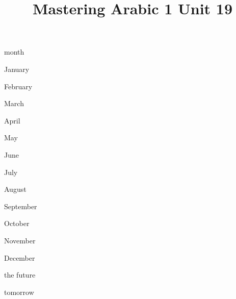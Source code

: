 \documentclass[avery5371,grid,frame]{flashcards}
\title{Mastering Arabic 1 Unit 19}
\begin{document}
\begin{flashcard}{\LARGE month}
\LARGE {}
\end{flashcard}
\begin{flashcard}{\LARGE January}
\LARGE {}
\end{flashcard}
\begin{flashcard}{\LARGE February}
\LARGE {}
\end{flashcard}
\begin{flashcard}{\LARGE March}
\LARGE {}
\end{flashcard}
\begin{flashcard}{\LARGE April}
\LARGE {}
\end{flashcard}
\begin{flashcard}{\LARGE May}
\LARGE {}
\end{flashcard}
\begin{flashcard}{\LARGE June}
\LARGE {}
\end{flashcard}
\begin{flashcard}{\LARGE July}
\LARGE {}
\end{flashcard}
\begin{flashcard}{\LARGE August}
\LARGE {}
\end{flashcard}
\begin{flashcard}{\LARGE September}
\LARGE {}
\end{flashcard}
\begin{flashcard}{\LARGE October}
\LARGE {}
\end{flashcard}
\begin{flashcard}{\LARGE November}
\LARGE {}
\end{flashcard}
\begin{flashcard}{\LARGE December}
\LARGE {}
\end{flashcard}
\begin{flashcard}{\LARGE the future}
\LARGE {}
\end{flashcard}
\begin{flashcard}{\LARGE tomorrow}
\LARGE {}
\end{flashcard}
\end{document}
